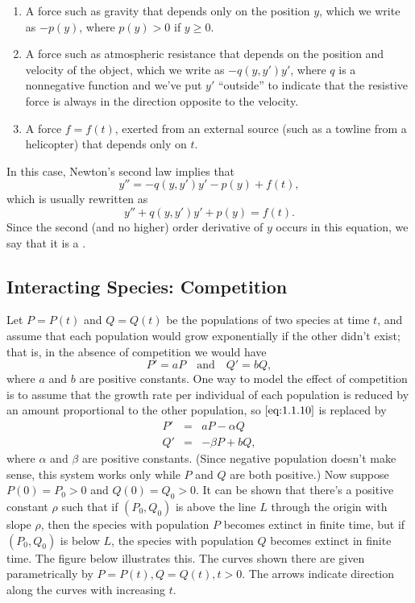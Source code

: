 \documentclass{ximera}
\begin{document}
\begin{enumerate}
\item %
A force such as gravity that depends only on the position $y$,
which we write as $-p(y)$, where $p(y)>0$ if $y\ge0$.
 
\item %
A force such as atmospheric resistance that depends on
the position and velocity of the object, which we write as
$-q(y,y')y'$, where $q$ is a nonnegative function and we've
put $y'$ ``outside'' to indicate that the resistive force is
always in the direction opposite to the velocity.
\item %
A force $f=f(t)$, exerted from an external source (such as a towline
from a helicopter) that depends only on $t$.
\end{enumerate}
 
In this case, Newton's second law implies that
$$
y''=-q(y,y')y'-p(y)+f(t),
$$
which is usually rewritten as
$$
y''+q(y,y')y'+p(y)=f(t).
$$
Since the  second (and no higher) order derivative of $y$ occurs in
this equation, we say that it is a .
 
 
 
\subsection*{Interacting Species: Competition}
 
Let $P=P(t)$ and $Q=Q(t)$ be the populations of two species at time
$t$, and assume that each population would grow exponentially if the
other didn't exist; that is, in the absence of competition we would
have
\begin{equation} \label{eq:1.1.10}
P'=aP \quad\text{and}\quad Q'=bQ,
\end{equation}
where $a$ and $b$ are positive constants. One way to model the effect
of competition is to assume that the growth rate per individual of
each population is reduced by an amount proportional to the other
population, so $\eqref{eq:1.1.10}$ is replaced by
\begin{eqnarray*}
P'&=&aP-\alpha Q\\
Q'&=&-\beta P+bQ,
\end{eqnarray*}
where $\alpha$ and $\beta$ are positive constants. (Since negative
population doesn't make sense, this system works only while $P$ and
$Q$ are both positive.) Now suppose   $P(0)=P_0>0$ and
$Q(0)=Q_0>0$. It can be shown %
that there's a  positive constant $\rho$ such that if
$(P_0,Q_0)$ is above the line $L$ through the origin with slope $\rho$,
then the species with population $P$ becomes extinct in finite time,
but if $(P_0,Q_0)$ is below $L$,   the species with population
$Q$ becomes extinct in finite time. The figure below illustrates
this. The curves shown there are given parametrically by $P=P(t),
Q=Q(t), t>0$.
 The arrows indicate direction along the curves with
increasing $t$.
\end{document}

